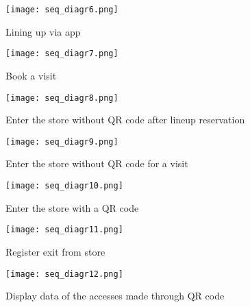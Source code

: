\begin{figure}
    \centering
    \texttt{[image: seq\_diagr6.png]}
    \caption{Lining up via app}
\end{figure}

\begin{figure}
    \centering
    \texttt{[image: seq\_diagr7.png]}
    \caption{Book a visit}
\end{figure}

\begin{figure}
    \centering
    \texttt{[image: seq\_diagr8.png]}
    \caption{Enter the store without QR code after lineup reservation}
\end{figure}

\begin{figure}
    \centering
    \texttt{[image: seq\_diagr9.png]}
    \caption{Enter the store without QR code for a visit}
\end{figure}

\begin{figure}
    \centering
    \texttt{[image: seq\_diagr10.png]}
    \caption{Enter the store with a QR code}
\end{figure}

\begin{figure}
    \centering
    \texttt{[image: seq\_diagr11.png]}
    \caption{Register exit from store}
\end{figure}

\begin{figure}
    \centering
    \texttt{[image: seq\_diagr12.png]}
    \caption{Display data of the accesses made through QR code}
\end{figure}

\clearpage